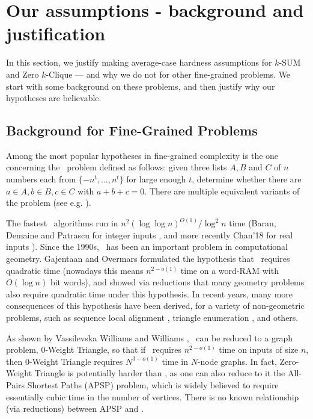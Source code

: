 \section{Our assumptions - background and justification}
\label{sec:justifyAssumptions}
In this section, we justify making average-case hardness assumptions for $k$-SUM and Zero $k$-Clique --- and why we do not for other fine-grained problems. We start with some background on these problems, and then justify why our hypotheses are believable.

\subsection{Background for Fine-Grained Problems}
Among the most popular hypotheses in fine-grained complexity is the one concerning the \ThSum~problem defined as follows: given three lists $A,B$ and $C$ of $n$ numbers each from $\{-n^t,\ldots,n^t\}$ for large enough $t$, determine whether there are $a\in A, b\in B, c\in C$ with $a+b+c=0$. There are multiple equivalent variants of the problem (see e.g. \cite{3sumIntroduction}).%

The fastest \ThSum~algorithms run in $n^2(\log\log n)^{O(1)}/\log^2 n$ time (Baran, Demaine and Patrascu for integer inputs \cite{BaranDP08}, and more recently Chan'18 for real inputs \cite{Chan18}). Since the 1990s, \ThSum~has been an important problem in computational geometry. Gajentaan and Overmars \cite{3sumIntroduction} formulated the hypothesis that \ThSum~requires quadratic time (nowadays this means
$n^{2-o(1)}$ time on a word-RAM with $O(\log n)$ bit words), and showed via reductions that many geometry problems also require quadratic time under this hypothesis. %
In recent years, many more consequences of this hypothesis have been derived, for a variety of non-geometric problems, such as sequence local alignment \cite{abboud2014consequences}, triangle enumeration \cite{Patrascu10,KopelowitzPP16}, and others.

As shown by Vassilevska Williams and Williams \cite{virgi10}, \ThSum~can be reduced to a graph problem, 0-Weight Triangle, so that if \ThSum~requires $n^{2-o(1)}$ time on inputs of size $n$, then 0-Weight Triangle requires $N^{3-o(1)}$ time in $N$-node graphs. In fact, Zero-Weight Triangle is potentially harder than \ThSum, as one can also reduce to it the All-Pairs Shortest Paths (APSP) problem, which is widely believed to require essentially cubic time in the number of vertices. There is no known relationship (via reductions) between APSP and \ThSum.

